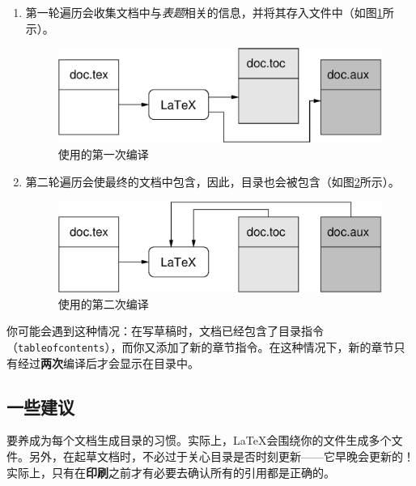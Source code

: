 \begin{enumerate}
  \item 第一轮遍历会收集文档中与\emph{表题}相关的信息，并将其存入文件中（如图\ref{fig:toc1}所示）。
  
  \begin{figure}[ht]
    \begin{center}
      \includegraphics{img/toc1.eps}
    \end{center}
    \caption{使用的第一次编译}
    \label{fig:toc1}
  \end{figure}

  \item 第二轮遍历会使最终的文档中包含，因此，目录也会被包含（如图\ref{fig:toc2}所示）。
  
  \begin{figure}[ht]
    \begin{center}
      \includegraphics{img/toc2.eps}
    \end{center}
    \caption{使用的第二次编译}
    \label{fig:toc2}
  \end{figure}

\end{enumerate}

你可能会遇到这种情况：在写草稿时，文档已经包含了目录指令（\verb|tableofcontents|），而你又添加了新的章节指令。在这种情况下，新的章节只有经过\textbf{两次}编译后才会显示在目录中。

\subsection{一些建议}

要养成为每个文档生成目录的习惯。实际上，\LaTeX 会围绕你的文件生成多个文件。另外，在起草文档时，不必过于关心目录是否时刻更新——它早晚会更新的！实际上，只有在\textbf{印刷}之前才有必要去确认所有的引用都是正确的。

